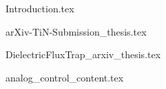 





\begin{frontmatter}










\cleardoublepage
{}
\begin{singlespace}
\tableofcontents
\end{singlespace}

\end{frontmatter}

\pagestyle{plain} %

{Introduction.tex}

{arXiv-TiN-Submission_thesis.tex}

{DielectricFluxTrap_arxiv_thesis.tex}



{analog_control_content.tex}



%
%


